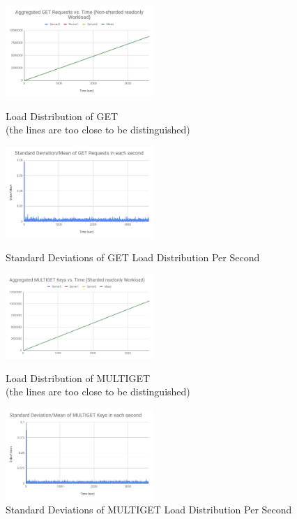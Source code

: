 \begin{figure}[!ht]
\parbox{.5\linewidth}{
\centering
\captionsetup{justification=centering}
\includegraphics[width=0.5\textwidth]{img/1_get_aggregated.png}
\caption{\label{fig:load_distribution_get_aggregated}Load Distribution of GET \\(the lines are too close to be distinguished)}
}
\parbox{.5\linewidth}{
\centering
\captionsetup{justification=centering}
\includegraphics[width=0.5\textwidth]{img/1_get_stdev.png}
\caption{\label{fig:load_distribution_get_stdev}Standard Deviations of GET Load Distribution Per Second}
}

\parbox{.5\linewidth}{
\centering
\captionsetup{justification=centering}
\includegraphics[width=0.5\textwidth]{img/1_multiget_aggregated.png}
\caption{\label{fig:load_distribution_multiget_aggregated}Load Distribution of MULTIGET \\(the lines are too close to be distinguished)}
}
\parbox{.5\linewidth}{
\centering
\captionsetup{justification=centering}
\includegraphics[width=0.5\textwidth]{img/1_multiget_stdev.png}
\caption{\label{fig:load_distribution_multiget_stdev}Standard Deviations of MULTIGET Load Distribution Per Second}
}
\end{figure}

